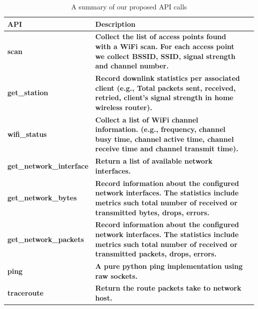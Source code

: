 {\begin{table}
\scriptsize
\centering
\begin{tabular}{|p{}| p{}| m{}|}
\hline
\textbf{API}    &  \textbf{Description} \\
 \hline
 {\bf scan} & {\bf Collect the list of access points found with a WiFi scan. For each access point we collect BSSID, SSID, signal strength and channel number.} \\
\hline
 {\bf get\_station} & {\bf Record downlink statistics per associated client (e.g., Total packets sent, received, retried, client's signal strength in home wireless router).} \\
\hline
 {\bf wifi\_status} & {\bf Collect a list of WiFi channel information. (e.g., frequency, channel busy time, channel active time, channel receive time and channel transmit time).} \\
\hline
 {\bf get\_network\_interface} & {\bf Return a list of available network interfaces.} \\
\hline
 {\bf get\_network\_bytes} & {\bf Record information about the configured network interfaces. The statistics include metrics such total number of received or transmitted bytes, drops, errors.} \\
\hline
 {\bf get\_network\_packets} & {\bf Record information about the configured network interfaces. The statistics include metrics such total number of received or transmitted packets, drops, errors.} \\
\hline
 {\bf ping} & {\bf A pure python ping implementation using raw sockets.} \\
\hline
 {\bf traceroute} & {\bf Return the route packets take to network host. } \\
\hline
\end{tabular}
\caption {A summary of our proposed API calls}
\label{table:new_api}
\end{table}

}
